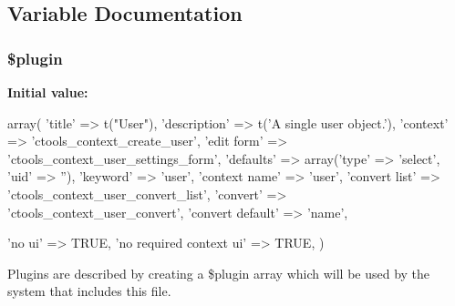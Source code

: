 \subsection{Variable Documentation}
\hypertarget{user_8inc_ada8a7130088351710bb02ed622d6bf65}{
\subsubsection[{\$plugin}]{\setlength{\rightskip}{0pt plus 5cm}\$plugin}}
\label{user_8inc_ada8a7130088351710bb02ed622d6bf65}
{\bfseries Initial value:}
\begin{DoxyCode}
 array(
  'title' => t("User"),
  'description' => t('A single user object.'),
  'context' => 'ctools_context_create_user',
  'edit form' => 'ctools_context_user_settings_form',
  'defaults' => array('type' => 'select', 'uid' => ''),
  'keyword' => 'user',
  'context name' => 'user',
  'convert list' => 'ctools_context_user_convert_list',
  'convert' => 'ctools_context_user_convert',
  'convert default' => 'name',

  
  'no ui' => TRUE,
  'no required context ui' => TRUE,
)
\end{DoxyCode}
Plugins are described by creating a \$plugin array which will be used by the system that includes this file. 